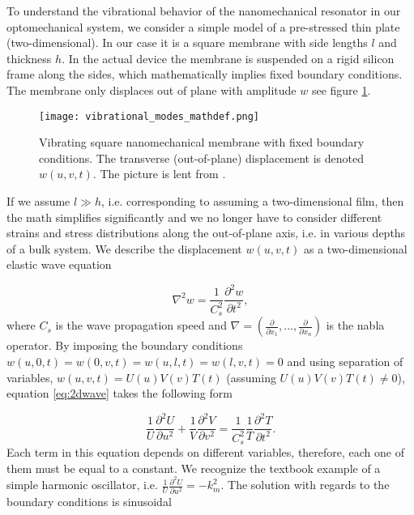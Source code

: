 To understand the vibrational behavior of the nanomechanical resonator in our optomechanical system, we consider a simple model of a pre-stressed thin plate (two-dimensional). In our case it is  a square membrane with side lengths $l$ and thickness $h$. In the actual device the membrane is suspended on a rigid silicon frame along the sides, which mathematically implies fixed boundary conditions. The membrane only displaces out of plane with amplitude $w$ see figure \ref{fig:vib_mod_mathdef}.

\begin{figure}[h!]
\begin{center}
\texttt{[image: vibrational\_modes\_mathdef.png]}
\end{center}
\caption{Vibrating square nanomechanical membrane with fixed boundary conditions. The transverse (out-of-plane) displacement is denoted $w(u, v, t)$. The picture is lent from \cite{barg2014}.}
\label{fig:vib_mod_mathdef}
\end{figure}

If we assume $l \gg h$, i.e. corresponding to assuming a two-dimensional film, then the math simplifies significantly and we no longer have to consider different strains and stress distributions along the out-of-plane axis, i.e. in various depths of a bulk system. We describe the displacement $w(u, v, t)$ as a two-dimensional elastic wave equation \cite{Wilson2011}

\begin{equation}
\nabla^2 w = \frac{1}{C_s^2}\frac{\partial^2 w}{\partial t^2},
\label{eq:2dwave}
\end{equation}
\noindent
where $C_s$ is the wave propagation speed and $\nabla = \left(\frac{\partial}{\partial x_1},...,\frac{\partial}{\partial x_n} \right)$ is the nabla operator. By imposing the boundary conditions $w(u, 0, t) = w(0, v, t) = w(u, l, t) = w(l, v, t) = 0$ and using separation of variables, $w(u, v, t) = U(u)V(v)T(t)$ (assuming $U(u)V(v)T(t) \neq 0$), equation \eqref{eq:2dwave} takes the following form

\begin{equation}
\frac{1}{U}\frac{\partial^2 U}{\partial u^2} + \frac{1}{V}\frac{\partial^2 V}{\partial v^2} = \frac{1}{C_s^2}\frac{1}{T}\frac{\partial^2 T}{\partial t^2}
\label{eq:2dwavesep}.
\end{equation}
\noindent
Each term in this equation depends on different variables, therefore, each one of them must be equal to a constant. We recognize the textbook example of a simple harmonic oscillator, i.e. $\frac{1}{U}\frac{\partial^2 U}{\partial u^2} = -k_m^2$. The solution with regards to the boundary conditions is sinusoidal

